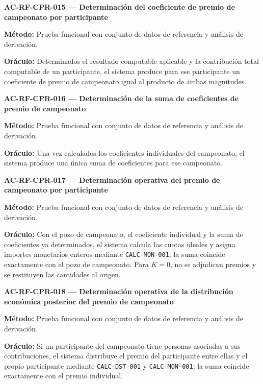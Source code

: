 \documentclass[10pt,letterpaper]{article}
\begin{document}
\noindent\textbf{AC-RF-CPR-015 --- Determinación del coeficiente de premio de campeonato por participante}\par
\textbf{Método:} Prueba funcional con conjunto de datos de referencia y análisis de derivación.\par
\textbf{Oráculo:} Determinados el resultado computable aplicable y la contribución total computable de un participante, el sistema produce para ese participante un coeficiente de premio de campeonato igual al producto de ambas magnitudes.\par\vspace{0.45em}
\noindent\textbf{AC-RF-CPR-016 --- Determinación de la suma de coeficientes de premio de campeonato}\par
\textbf{Método:} Prueba funcional con conjunto de datos de referencia y análisis de derivación.\par
\textbf{Oráculo:} Una vez calculados los coeficientes individuales del campeonato, el sistema produce una única suma de coeficientes para ese campeonato.\par\vspace{0.45em}
\noindent\textbf{AC-RF-CPR-017 --- Determinación operativa del premio de campeonato por participante}\par
\textbf{Método:} Prueba funcional con conjunto de datos de referencia y análisis de derivación.\par
\textbf{Oráculo:} Con el pozo de campeonato, el coeficiente individual y la suma de coeficientes ya determinados, el sistema calcula las cuotas ideales y asigna importes monetarios enteros mediante \texttt{CALC-MON-001}; la suma coincide exactamente con el pozo de campeonato. Para $K=0$, no se adjudican premios y se restituyen las cantidades al origen.\par\vspace{0.45em}
\noindent\textbf{AC-RF-CPR-018 --- Determinación operativa de la distribución económica posterior del premio de campeonato}\par
\textbf{Método:} Prueba funcional con conjunto de datos de referencia y análisis de derivación.\par
\textbf{Oráculo:} Si un participante del campeonato tiene personas asociadas a sus contribuciones, el sistema distribuye el premio del participante entre ellas y el propio participante mediante \texttt{CALC-DST-001} y \texttt{CALC-MON-001}; la suma coincide exactamente con el premio individual.\par\vspace{0.45em}
\end{document}
